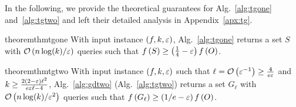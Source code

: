 In the following, we provide the theoretical guarantees for
Alg.~\ref{alg:tgone} and~\ref{alg:tgtwo}
and left their detailed analysis in Appendix~\ref{apx:tg}.
\begin{restatable}{theorem}{thmtgone}\label{thm:tgone}
With input instance $(f, k, \varepsilon)$, Alg.~\ref{alg:tgone} returns a set $S$ with $\mathcal O \left( n\log (k)/\varepsilon \right)$ queries
such that $f \left( S \right) \ge \left(\frac{1}{4}-\varepsilon\right) f \left( O \right)$.
\end{restatable}

\begin{restatable}{theorem}{thmtgtwo}\label{thm:tgtwo}
With input instance $(f, k, \varepsilon)$
such that $\ell = \mathcal O \left( \varepsilon^{-1} \right)\ge \frac{4}{e\varepsilon}$
and $k \ge \frac{2(2-\varepsilon)\ell^2}{e\varepsilon\ell-4}$,
Alg.~\ref{alg:gdtwo} (Alg.~\ref{alg:tgtwo}) returns a set $G_\ell$ with $\mathcal O \left( n\log(k)/\varepsilon^2 \right)$ queries
such that $f \left( G_\ell \right) \ge \left(1/e-\varepsilon\right) f \left( O \right)$.
\end{restatable}

